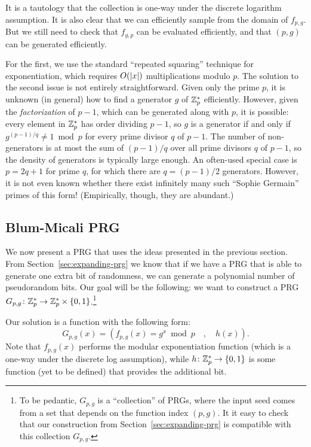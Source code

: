\documentclass[11pt]{article}
\begin{document}
It is a tautology that the collection is one-way under the discrete
logarithm assumption.  It is also clear that we can efficiently sample
from the domain of $f_{p,g}$.  But we still need to check that
$f_{g,p}$ can be evaluated efficiently, and that $(p,g)$ can be
generated efficiently.

For the first, we use the standard ``repeated squaring'' technique for
exponentiation, which requires $O(\lvert x\rvert)$ multiplications modulo
$p$.  The solution to the second issue is not entirely
straightforward.  Given only the prime $p$, it is unknown (in general)
how to find a generator $g$ of $\mathbb{Z}_p^{*}$ efficiently.  However, given
the \emph{factorization} of $p-1$, which can be generated along with
$p$, it is possible: every element in $\mathbb{Z}_p^{*}$ has order dividing
$p-1$, so $g$ is a generator if and only if $g^{(p-1)/q} \neq 1 \bmod
p$ for every prime divisor $q$ of $p-1$.  The number of non-generators
is at most the sum of $(p-1)/q$ over all prime divisors $q$ of $p-1$,
so the density of generators is typically large enough.  An often-used
special case is $p = 2q+1$ for prime $q$, for which there are $q =
(p-1)/2$ generators.  However, it is not even known whether there
exist infinitely many such ``Sophie Germain'' primes of this form!
(Empirically, though, they are abundant.)


\subsection{Blum-Micali PRG}
\label{sec:blum-micali-prg}

We now present a PRG that uses the ideas presented in the previous
section.  From Section~\ref{sec:expanding-prg} we know that if we have
a PRG that is able to generate one extra bit of randomness, we can
generate a polynomial number of pseudorandom bits.  Our goal will be
the following: we want to construct a PRG $G_{p,g} \colon \mathbb{Z}_p^* \to
\mathbb{Z}_p^* \times \{0,1\}$.\footnote{To be pedantic, $G_{p,g}$ is a
  ``collection'' of PRGs, where the input seed comes from a set that
  depends on the function index $(p,g)$.  It it easy to check that our
  construction from Section~\ref{sec:expanding-prg} is compatible with
  this collection $G_{p,g}$.}

Our solution is a function with the following form: \[ G_{p,g}(x)=
(f_{p,g}(x)=g^x \bmod p \quad, \quad h(x)). \] Note that $f_{p,g}(x)$
performs the modular exponentiation function (which is a one-way under
the discrete log assumption), while $h \colon \mathbb{Z}_p^{*} \to \{0,1\}$ is
some function (yet to be defined) that provides the additional bit.
\end{document}
